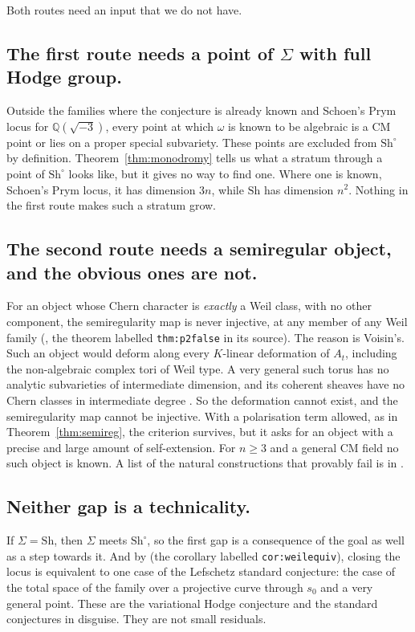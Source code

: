 \documentclass[11pt]{amsart}
\theoremstyle{definition}
\theoremstyle{remark}
\newcommand{\QQ}{\mathbb{Q}}
\newcommand{\Sh}{\mathrm{Sh}}
\begin{document}
Both routes need an input that we do not have.

\subsection*{The first route needs a point of \texorpdfstring{$\Sigma$}{Sigma} with full Hodge group.}
Outside the families where the conjecture is already known and Schoen's
Prym locus for $\QQ(\sqrt{-3})$, every point at which $\omega$ is known to
be algebraic is a CM point or lies on a proper special subvariety. These
points are excluded from $\Sh^{\circ}$ by definition.
Theorem~\ref{thm:monodromy} tells us what a stratum through a point of
$\Sh^{\circ}$ looks like, but it gives no way to find one. Where one is
known, Schoen's Prym locus, it has dimension $3n$, while $\Sh$ has
dimension $n^{2}$. Nothing in the first route makes such a stratum grow.

\subsection*{The second route needs a semiregular object, and the obvious
ones are not.}
For an object whose Chern character is \emph{exactly} a Weil class, with no
other component, the semiregularity map is never injective, at any member
of any Weil family (\cite{BhH8}, the theorem labelled \texttt{thm:p2false}
in its source). The reason is
Voisin's. Such an object would deform along every $K$-linear deformation of
$A_{t}$, including the non-algebraic complex tori of Weil type. A very
general such torus has no analytic subvarieties of intermediate dimension,
and its coherent sheaves have no Chern classes in intermediate degree
\cite{Voi02b}. So the deformation cannot exist, and the semiregularity map
cannot be injective. With a polarisation term allowed, as in
Theorem~\ref{thm:semireg}, the criterion survives, but it asks for an object
with a precise and large amount of self-extension. For $n\ge3$ and a
general CM field no such object is known. A list of the natural
constructions that provably fail is in \cite{BhH8}.

\subsection*{Neither gap is a technicality.}
If $\Sigma=\Sh$, then $\Sigma$ meets $\Sh^{\circ}$, so the first gap is
a consequence of the goal as well as a step towards it. And by
\cite{BhH8} (the corollary labelled \texttt{cor:weilequiv}), closing the
locus is equivalent to one case of the Lefschetz standard conjecture: the
case of the total space of the family over a projective curve through
$s_{0}$ and a very general point. These are the variational Hodge
conjecture and the standard conjectures in disguise. They are not small residuals.
\end{document}
